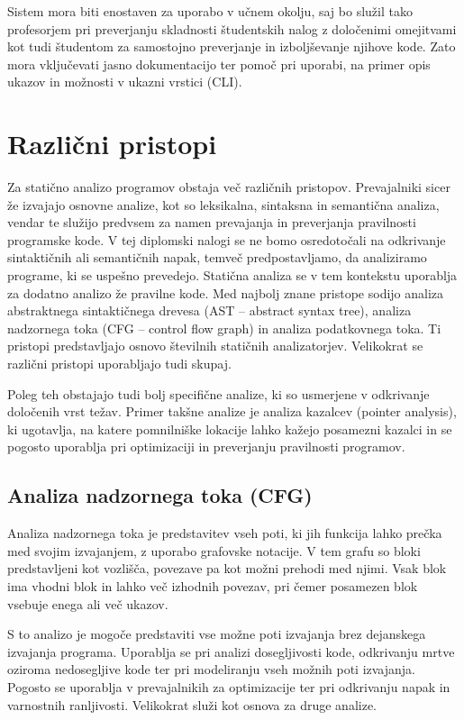 \documentclass[a4paper,12pt,openright]{book}
\begin{document}
Sistem mora biti enostaven za uporabo v učnem okolju, saj bo služil tako profesorjem pri preverjanju skladnosti študentskih nalog z določenimi omejitvami kot tudi študentom za samostojno preverjanje in izboljševanje njihove kode. Zato mora vključevati jasno dokumentacijo ter pomoč pri uporabi, na primer opis ukazov in možnosti v ukazni vrstici (CLI).

\section{Različni pristopi}

Za statično analizo programov obstaja več različnih pristopov. Prevajalniki sicer že izvajajo osnovne analize, kot so leksikalna, sintaksna in semantična analiza, vendar te služijo predvsem za namen prevajanja in preverjanja pravilnosti programske kode. V tej diplomski nalogi se ne bomo osredotočali na odkrivanje sintaktičnih ali semantičnih napak, temveč predpostavljamo, da analiziramo programe, ki se uspešno prevedejo. Statična analiza se v tem kontekstu uporablja za dodatno analizo že pravilne kode. Med najbolj znane pristope sodijo analiza abstraktnega sintaktičnega drevesa (AST – abstract syntax tree), analiza nadzornega toka (CFG – control flow graph) in analiza podatkovnega toka. Ti pristopi predstavljajo osnovo številnih statičnih analizatorjev. Velikokrat se različni pristopi uporabljajo tudi skupaj.

Poleg teh obstajajo tudi bolj specifične analize, ki so usmerjene v odkrivanje določenih vrst težav. Primer takšne analize je analiza kazalcev (pointer analysis), ki ugotavlja, na katere pomnilniške lokacije lahko kažejo posamezni kazalci in se pogosto uporablja pri optimizaciji in preverjanju pravilnosti programov.

\subsection{Analiza nadzornega toka (CFG)}

Analiza nadzornega toka je predstavitev vseh poti, ki jih funkcija lahko prečka med svojim izvajanjem, z uporabo grafovske notacije. V tem grafu so bloki predstavljeni kot vozlišča, povezave pa kot možni prehodi med njimi. Vsak blok ima vhodni blok in lahko več izhodnih povezav, pri čemer posamezen blok vsebuje enega ali več ukazov.

S to analizo je mogoče predstaviti vse možne poti izvajanja brez dejanskega izvajanja programa. Uporablja se pri analizi dosegljivosti kode, odkrivanju mrtve oziroma nedosegljive kode ter pri modeliranju vseh možnih poti izvajanja. Pogosto se uporablja v prevajalnikih za optimizacije ter pri odkrivanju napak in varnostnih ranljivosti. Velikokrat služi kot osnova za druge analize.
\end{document}
